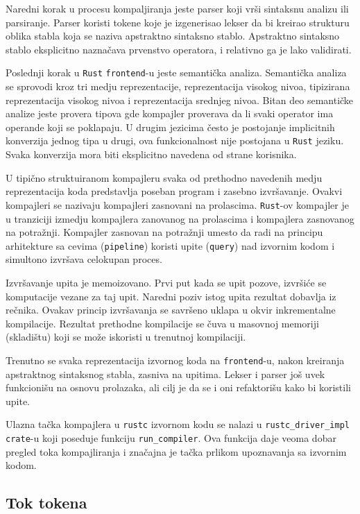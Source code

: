 \documentclass[11pt]{article}
\begin{document}
Naredni korak u procesu kompaljiranja jeste parser koji vrši sintaksnu analizu ili parsiranje. 
Parser koristi tokene koje je izgenerisao lekser da bi kreirao strukturu oblika stabla koja se naziva 
apstraktno sintaksno stablo. Apstraktno sintaksno stablo eksplicitno naznačava prvenstvo operatora,
i relativno ga je lako validirati.

Poslednji korak u \verb|Rust| \verb|frontend|-u jeste semantička analiza. Semantička analiza se sprovodi 
kroz tri medju reprezentacije, reprezentacija visokog nivoa, tipizirana reprezentacija visokog nivoa
i reprezentacija srednjeg nivoa. Bitan deo semantičke analize jeste provera tipova gde kompajler proverava 
da li svaki operator ima operande koji se poklapaju. U drugim jezicima često je postojanje implicitnih 
konverzija jednog tipa u drugi, ova funkcionalnost nije postojana u \verb|Rust| jeziku. Svaka konverzija 
mora biti eksplicitno navedena od strane korisnika.

U tipično struktuiranom kompajleru svaka od prethodno navedenih medju reprezentacija koda predstavlja 
poseban program i zasebno izvršavanje. Ovakvi kompajleri se nazivaju 
kompajleri zasnovani na prolascima. \verb|Rust|-ov kompajler je u tranziciji izmedju 
kompajlera zanovanog na prolascima i kompajlera zasnovanog na potražnji. Kompajler 
zasnovan na potražnji umesto da radi na principu arhitekture sa cevima (\verb|pipeline|)
koristi upite (\verb|query|) nad izvornim kodom i simultono izvršava celokupan proces.

Izvršavanje upita je memoizovano. Prvi put kada se upit pozove, izvršiće se komputacije 
vezane za taj upit. Naredni poziv istog upita rezultat dobavlja iz rečnika.
Ovakav princip izvršavanja se savršeno uklapa u okvir inkrementalne kompilacije. 
Rezultat prethodne kompilacije se čuva u masovnoj memoriji (skladištu) koji se može iskoristi
u trenutnoj kompilaciji.

Trenutno se svaka reprezentacija izvornog koda na \verb|frontend|-u, 
nakon kreiranja apstraktnog sintaksnog stabla, zasniva na upitima. 
Lekser i parser još uvek funkcionišu na osnovu prolazaka, 
ali cilj je da se i oni refaktorišu kako bi koristili upite.

Ulazna tačka kompajlera u \verb|rustc| izvornom kodu se nalazi u \verb|rustc_driver_impl| \verb|crate|-u
koji poseduje funkciju \verb|run_compiler|. Ova funkcija daje veoma dobar pregled toka kompajliranja 
i značajna je tačka prlikom upoznavanja sa izvornim kodom. 

\subsection{Tok tokena}
\end{document}
